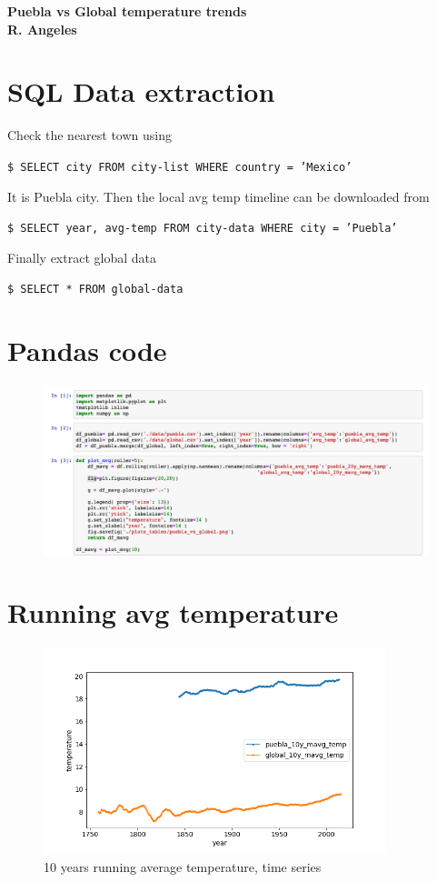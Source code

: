 \documentclass{article}
\newcommand{\sh}[1]{\indent\indent\texttt{\footnotesize\$ #1}}
\begin{document}
    {\bfseries\Large
        Puebla vs Global temperature trends\\
        \vskip1cm
        R. Angeles\\
    }    




\section{SQL Data extraction}

Check the nearest town using

\sh{SELECT city FROM city-list WHERE country = 'Mexico'}

It is Puebla city. Then the local avg temp timeline can be downloaded from

\sh{SELECT year, avg-temp FROM city-data WHERE city = 'Puebla' }

Finally extract global data 

\sh{SELECT * FROM global-data }

\section{Pandas code}

\begin{figure}[!h]
\centering
  \includegraphics[width=120mm]{../plots_tables/jupyter.png}
\end{figure}

\section{Running avg temperature}
\begin{figure}[!h]
\centering
  \includegraphics[width=100mm]{../plots_tables/puebla_vs_global.png}
  \caption{10 years running average temperature, time series }\label{fig:vs}
\end{figure}
\end{document}
